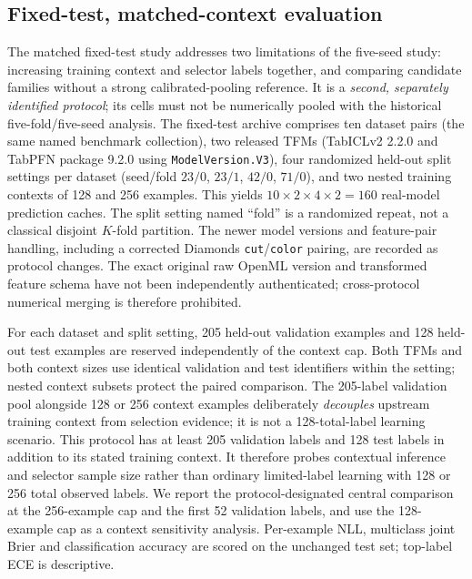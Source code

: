 \documentclass[a4paper,fleqn]{cas-sc}
\begin{document}
\subsection{Fixed-test, matched-context evaluation}
\label{sec:fixedtest}
The matched fixed-test study addresses two limitations of the five-seed study: increasing training context and selector labels together, and comparing candidate families without a strong calibrated-pooling reference. It is a \emph{second, separately identified protocol}; its cells must not be numerically pooled with the historical five-fold/five-seed analysis. The fixed-test archive comprises ten dataset pairs (the same named benchmark collection), two released TFMs (TabICLv2 2.2.0 and TabPFN package 9.2.0 using \texttt{ModelVersion.V3}), four randomized held-out split settings per dataset (seed/fold $23/0$, $23/1$, $42/0$, $71/0$), and two nested training contexts of 128 and 256 examples. This yields $10\times2\times4\times2=160$ real-model prediction caches. The split setting named ``fold'' is a randomized repeat, not a classical disjoint $K$-fold partition. The newer model versions and feature-pair handling, including a corrected Diamonds \texttt{cut}/\texttt{color} pairing, are recorded as protocol changes. The exact original raw OpenML version and transformed feature schema have not been independently authenticated; cross-protocol numerical merging is therefore prohibited.

For each dataset and split setting, 205 held-out validation examples and 128 held-out test examples are reserved independently of the context cap. Both TFMs and both context sizes use identical validation and test identifiers within the setting; nested context subsets protect the paired comparison. The 205-label validation pool alongside 128 or 256 context examples deliberately \emph{decouples} upstream training context from selection evidence; it is not a 128-total-label learning scenario. This protocol has at least 205 validation labels and 128 test labels in addition to its stated training context. It therefore probes contextual inference and selector sample size rather than ordinary limited-label learning with 128 or 256 total observed labels. We report the protocol-designated central comparison at the 256-example cap and the first 52 validation labels, and use the 128-example cap as a context sensitivity analysis. Per-example NLL, multiclass joint Brier and classification accuracy are scored on the unchanged test set; top-label ECE is descriptive.
\end{document}
